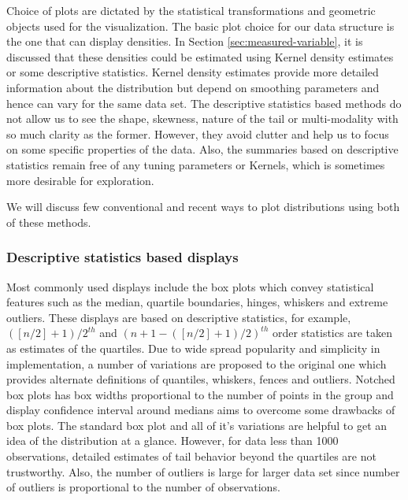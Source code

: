 \documentclass[12pt]{article}
\begin{document}
Choice of plots are dictated by the statistical transformations and geometric objects used for the visualization. The basic plot choice for our data structure is the one that can display densities. In Section \ref{sec:measured-variable}, it is discussed that these densities could be estimated using Kernel density estimates or some descriptive statistics. Kernel density estimates provide more detailed information about the distribution but depend on smoothing parameters and hence can vary for the same data set. The descriptive statistics based methods do not allow us to see the shape, skewness, nature of the tail or multi-modality with so much clarity as the former. However, they avoid clutter and help us to focus on some specific properties of the data. Also, the summaries based on descriptive statistics remain free of any tuning parameters or Kernels, which is sometimes more desirable for exploration.

We will discuss few conventional and recent ways to plot distributions using both of these methods.

\hypertarget{descriptive-statistics-based-displays}{%
\subsubsection{Descriptive statistics based displays}\label{descriptive-statistics-based-displays}}

Most commonly used displays include the box plots \citep{Tukey1977-jx} which convey statistical features such as the median, quartile boundaries, hinges, whiskers and extreme outliers. These displays are based on descriptive statistics, for example, \(([n/2] + 1)/2^{th}\) and \((n + 1 - ([n/2] + 1)/2)^{th}\) order statistics are taken as estimates of the quartiles. Due to wide spread popularity and simplicity in implementation, a number of variations are proposed to the original one which provides alternate definitions of quantiles, whiskers, fences and outliers. Notched box plots \citep{Mcgill1978-hg} has box widths proportional to the number of points in the group and display confidence interval around medians aims to overcome some drawbacks of box plots. The standard box plot and all of it's variations are helpful to get an idea of the distribution at a glance. However, for data less than 1000 observations, detailed estimates of tail behavior beyond the quartiles are not trustworthy. Also, the number of outliers is large for larger data set since number of outliers is proportional to the number of observations.
\end{document}
